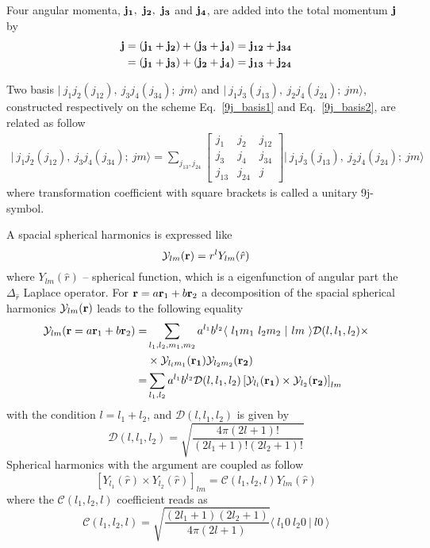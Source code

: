 \documentclass[
12pt, %
oneside, %
english, %
onehalfspacing, %
headsepline, %
]{MastersDoctoralThesis} %
\begin{document}
Four angular momenta, $\bf j_1,~j_2,~j_3$ and $\bf j_4$, are added into the total momentum $\bf j$ by
\begin{align}
\label{9j_basis1}
\bf j & =\bf \left( j_1 + j_2 \right) + ( j_3 + j_4) = j_{12} + j_{34} \\
\label{9j_basis2}		
& = \bf ( j_1 + j_3 ) + \left( j_2  + j_4 \right) = j_{13} +j_{24}
\end{align}

Two basis  $\vert~ j_1 j_2 (j_{12}),~j_3 j_4 (j_{34});~jm \rangle$ and $\vert~ j_1 j_3 (j_{13}),~j_2 j_4 (j_{24});~jm \rangle $, constructed respectively on the scheme Eq.~\ref{9j_basis1} and Eq.~\ref{9j_basis2},  are related as follow
\begin{align}
\label{9j}
\vert~ j_1 j_2 (j_{12}),~j_3 j_4 (j_{34});~jm \rangle = \sum_{j_{13},j_{24}} 
\begin{bmatrix}
j_1 & j_2 & j_{12} \\ 
j_3 & j_4 & j_{34} \\ 
j_{13} & j_{24} & j
\end{bmatrix} 
\vert~ j_1 j_3 (j_{13}),~j_2 j_4 (j_{24});~jm \rangle 
\end{align}
where transformation coefficient with square brackets is called a unitary 9j-symbol.


  A spacial spherical harmonics is expressed like
  \begin{equation}
  \mathcal{Y}_{lm}({\bf r}) = r^{l} Y_{lm}(\hat{r})
  \end{equation}
  where $Y_{lm}(\hat{r})$  -- spherical function, which is a eigenfunction of angular part the $\Delta_{\hat{r}}$ Laplace operator.
  For ${\bf r} = a{\bf r}_1+b {\bf r}_2$ a decomposition of the spacial spherical harmonics $\mathcal{Y}_{lm}({\bf r})$ leads to the following equality
  \begin{align}
  \mathcal{Y}_{lm}({\bf r} = a{\bf r}_1+b {\bf r}_2)=& \sum_{l_1,l_2,m_1,m_2} a^{l_1} b^{l_2}
  \langle ~ l_1 m_1~l_2 m_2~ \vert ~l m~  \rangle \mathcal{D}(l,l_1,l_2) \times \nonumber \\
   & \times \mathcal{Y}_{l_l m_1}({\bf r_1})  \mathcal{Y}_{l_2 m_2}({\bf r_2}) \nonumber \\
   = & \sum_{l_1,l_2} a^{l_1} b^{l_2}
   \mathcal{D}(l,l_1,l_2) \left[ \mathcal{Y}_{l_l}({\bf r_1}) \times \mathcal{Y}_{l_2}({\bf r_2}) \right]_{lm} 
   \label{sphHarmDecomp}
  \end{align}
  with the condition $l=l_1+l_2$, and $\mathcal{D}(l,l_1,l_2) $ is given by
  \begin{equation}
  \mathcal{D}(l,l_1,l_2)  = \sqrt{\frac{4 \pi (2l+1)!}{(2l_1+1)! (2l_2+1)!}}
  \end{equation}
Spherical harmonics with the argument are coupled as follow
\begin{equation}
\left[ Y_{l_1}(\hat{r}) \times Y_{l_2}(\hat{r})\right]_{lm} =  \mathcal{C}(l_1,l_2,l) Y_{lm}(\hat{r})
\end{equation}
where the $\mathcal{C}(l_1,l_2,l)$ coefficient reads as
\begin{equation}
\mathcal{C}(l_1,l_2,l) = \sqrt{\frac{(2l_1+1)(2l_2+1)}{4 \pi (2l+1)}} \langle ~ l_1 0~l_2 0~ \vert ~l 0~  \rangle
\end{equation}
\end{document}
